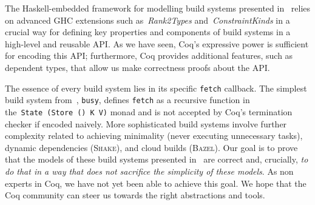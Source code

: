 \documentclass[sigplan,review]{acmart}\settopmatter{printfolios=true,printccs=false,printacmref=false}
\newcommand{\hs}{\texttt}
\newcommand{\Bazel}{\textsc{Bazel}\xspace}
\newcommand{\Shake}{\textsc{Shake}\xspace}
\begin{document}
The Haskell-embedded framework for modelling build systems presented
in~\cite{Mokhov2018icfp} relies on advanced GHC extensions such
as~\emph{Rank2Types} and~\emph{ConstraintKinds} in a crucial way for defining
key properties and components of build systems in a high-level and reusable API.
As we have seen, Coq's expressive power is sufficient for encoding this API;
furthermore, Coq provides additional features, such as dependent types, that
allow us make correctness proofs about the API.

The essence of every build system lies in its specific \hs{fetch} callback. The
simplest build system from~\cite{Mokhov2018icfp}, \hs{busy}, defines \hs{fetch}
as a recursive function in the~\hs{State}~\hs{(Store}~\hs{()}~\hs{K}~\hs{V)}
monad and is not accepted by Coq's termination checker if encoded naively. More
sophisticated build systems involve further complexity related to achieving
minimality (never executing unnecessary tasks), dynamic dependencies (\Shake),
and cloud builds (\Bazel). Our goal is to prove that the models of these
build systems presented in~\cite{Mokhov2018icfp} are correct and, crucially,
\emph{to do that in a way that does not sacrifice the simplicity of these models}.
As non experts in Coq, we have not yet been able to achieve this goal. We hope
that the Coq community can steer us towards the right abstractions and tools.



\end{document}
